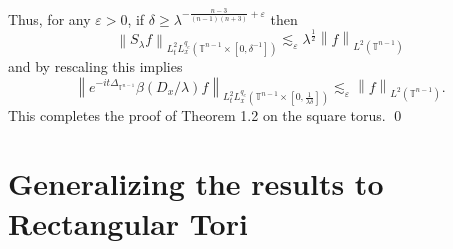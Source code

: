 \documentclass[11pt]{amsart}
\numberwithin{equation}{section}
\newcommand{\Tn}{\mathbb{T}^{n-1}}
\newcommand{\la}{\lambda}
\newcommand\norm[1]{\left\lVert#1\right\rVert}
\newcommand{\lpnorm}[3]{\norm{#1}_{L^{#2}(#3)}}
\newcommand{\mixlpnorm}[4]{\norm{#1}_{L^{#2}_{t} L^{#3}_{x}(#4)}}
\newcommand{\laplac}[1]{\Delta_{#1}}
\newcommand{\Sl}{S_{\la}}
\begin{document}
Thus, for any $\varepsilon > 0$, if $\delta \geq \la^{-\frac{n-3}{(n-1)(n+3)} + \varepsilon}$ then 
\begin{equation}
    \mixlpnorm{\Sl f}{2}{q_e}{\Tn \times [0, \delta^{-1}]} \lesssim_{\varepsilon} \la^{\frac{1}{2}}\lpnorm{f}{2}{\Tn}
\end{equation}
and by rescaling this implies
\begin{equation}
    \mixlpnorm{e^{-it \laplac{\Tn}}\beta(D_x/\la)f}{2}{q_e}{\Tn \times [0, \frac{1}{\la \delta}]} \lesssim_{\varepsilon} \lpnorm{f}{2}{\Tn}.
\end{equation}
This completes the proof of Theorem 1.2 on the square torus.
\qed

\section{Generalizing the results to Rectangular Tori}
\end{document}
